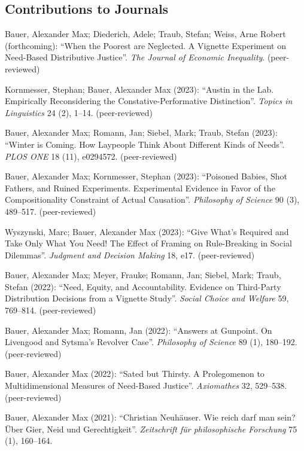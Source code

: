 \documentclass[a4paper,10pt]{article}
\newenvironment{literature}{%
   \parskip6pt\parindent0pt\raggedright
   \def\lititem{\hangindent=1cm\hangafter1}}{%
   \par\ignorespaces}
\begin{document}
\subsection*{Contributions to Journals}
\begin{literature}
\lititem Bauer, Alexander Max; Diederich, Adele; Traub, Stefan; Weiss, Arne Robert (forthcoming): \enquote{When the Poorest are Neglected. A Vignette Experiment on Need-Based Distributive Justice}. \textit{The Journal of Economic Inequality}. (peer-reviewed)

\lititem Kornmesser, Stephan; Bauer, Alexander Max (2023): \enquote{Austin in the Lab. Empirically Reconsidering the Constative-Performative Distinction}. \textit{Topics in Linguistics} 24 (2), 1--14. (peer-reviewed)

\lititem Bauer, Alexander Max; Romann, Jan; Siebel, Mark; Traub, Stefan (2023): \enquote{Winter is Coming. How Laypeople Think About Different Kinds of Needs}. \textit{PLOS ONE} 18 (11), e0294572. (peer-reviewed)

\lititem Bauer, Alexander Max; Kornmesser, Stephan (2023): \enquote{Poisoned Babies, Shot Fathers, and Ruined Experiments. Experimental Evidence in Favor of the Compositionality Constraint of Actual Causation}. \textit{Philosophy of Science} 90 (3), 489--517. (peer-reviewed)

\lititem Wyszynski, Marc; Bauer, Alexander Max (2023): \enquote{Give What's Required and Take Only What You Need! The Effect of Framing on Rule-Breaking in Social Dilemmas}. \textit{Judgment and Decision Making} 18, e17. (peer-reviewed)

\lititem Bauer, Alexander Max; Meyer, Frauke; Romann, Jan; Siebel, Mark; Traub, Stefan (2022): \enquote{Need, Equity, and Accountability. Evidence on Third-Party Distribution Decisions from a Vignette Study}. \textit{Social Choice and Welfare} 59, 769--814. (peer-reviewed)

\lititem Bauer, Alexander Max; Romann, Jan (2022): \enquote{Answers at Gunpoint. On Livengood and Sytsma's Revolver Case}. \textit{Philosophy of Science} 89 (1), 180--192. (peer-reviewed)

\lititem Bauer, Alexander Max (2022): \enquote{Sated but Thirsty. A Prolegomenon to Multidimensional Measures of Need-Based Justice}. \textit{Axiomathes} 32, 529--538. (peer-reviewed)

\lititem Bauer, Alexander Max (2021): \enquote{Christian Neuhäuser. Wie reich darf man
sein? Über Gier, Neid und Gerechtigkeit}. \textit{Zeitschrift für philosophische Forschung} 75 (1), 160--164.


\end{literature}
\end{document}
